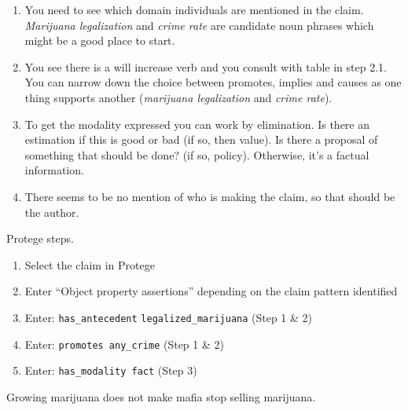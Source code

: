 \begin{enumerate}[label=\textbf{Step \arabic*.}, leftmargin=2cm, itemsep=0.5cm]
\item You need to see which domain individuals are mentioned in the claim.
\textit{Marijuana legalization} and \textit{crime rate} are candidate noun phrases which
might be a good place to start. 
\item You see there is a will increase verb and you consult with table in step
2.1. You can narrow down the choice between promotes, implies and
causes as one thing supports another (\textit{marijuana legalization}
and \textit{crime rate}).  
\item To get the modality expressed you can work by elimination. Is there an
estimation if this is good or bad (if so, then value). Is there a
proposal of something that should be done? (if so, policy).
		Otherwise, it’s a factual information. 
\item There seems to be no mention of who is making the claim, so that should
	be the author. 
\end{enumerate}

\noindent Protege steps. 
\begin{enumerate}
\item Select the claim in Protege
\item Enter ``Object property assertions'' depending on the claim pattern identified 
\item Enter: \texttt{has\_antecedent} \texttt{legalized\_marijuana} (Step 1 \& 2)
\item Enter: \texttt{promotes any\_crime} (Step 1 \& 2)
\item Enter: \texttt{has\_modality fact} (Step 3)
\end{enumerate}

\begin{mydef}
Growing marijuana does not make mafia stop selling marijuana.
\end{mydef}

